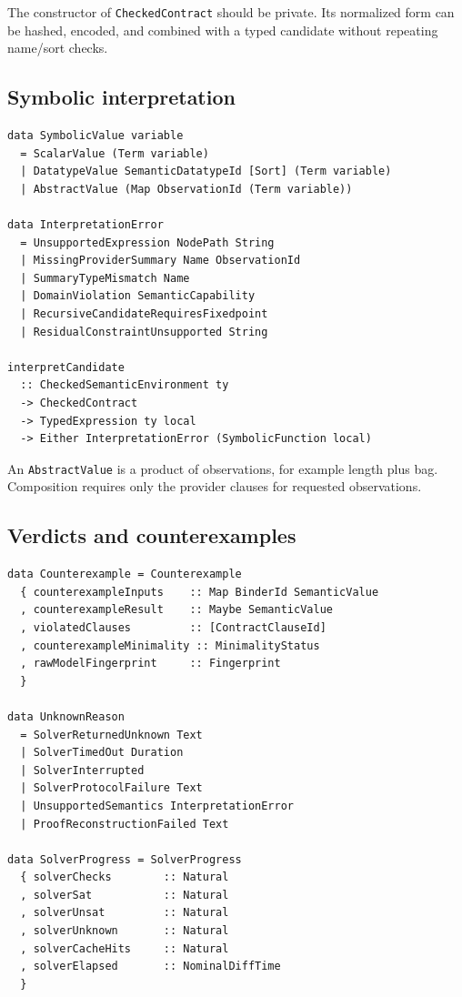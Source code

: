 \documentclass[11pt,oneside]{article}
\newcommand{\code}[1]{\texttt{#1}}
\begin{document}
The constructor of \code{CheckedContract} should be private. Its normalized form can be
hashed, encoded, and combined with a typed candidate without repeating name/sort checks.

\subsection{Symbolic interpretation}

\begin{lstlisting}[language=HaskellExt]
data SymbolicValue variable
  = ScalarValue (Term variable)
  | DatatypeValue SemanticDatatypeId [Sort] (Term variable)
  | AbstractValue (Map ObservationId (Term variable))

data InterpretationError
  = UnsupportedExpression NodePath String
  | MissingProviderSummary Name ObservationId
  | SummaryTypeMismatch Name
  | DomainViolation SemanticCapability
  | RecursiveCandidateRequiresFixedpoint
  | ResidualConstraintUnsupported String

interpretCandidate
  :: CheckedSemanticEnvironment ty
  -> CheckedContract
  -> TypedExpression ty local
  -> Either InterpretationError (SymbolicFunction local)
\end{lstlisting}

An \code{AbstractValue} is a product of observations, for example length plus bag.
Composition requires only the provider clauses for requested observations.

\subsection{Verdicts and counterexamples}

\begin{lstlisting}[language=HaskellExt]
data Counterexample = Counterexample
  { counterexampleInputs    :: Map BinderId SemanticValue
  , counterexampleResult    :: Maybe SemanticValue
  , violatedClauses         :: [ContractClauseId]
  , counterexampleMinimality :: MinimalityStatus
  , rawModelFingerprint     :: Fingerprint
  }

data UnknownReason
  = SolverReturnedUnknown Text
  | SolverTimedOut Duration
  | SolverInterrupted
  | SolverProtocolFailure Text
  | UnsupportedSemantics InterpretationError
  | ProofReconstructionFailed Text

data SolverProgress = SolverProgress
  { solverChecks        :: Natural
  , solverSat           :: Natural
  , solverUnsat         :: Natural
  , solverUnknown       :: Natural
  , solverCacheHits     :: Natural
  , solverElapsed       :: NominalDiffTime
  }
\end{lstlisting}
\end{document}
